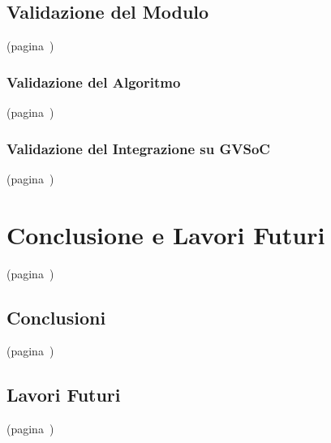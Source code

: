 \section{Validazione del Modulo}(pagina~\pageref{sec:mod_val})
\subsection{Validazione del Algoritmo}(pagina~\pageref{sec:alg_val})
\subsection{Validazione del Integrazione su GVSoC}(pagina~\pageref{sec:gvsoc_val})

\chapter{Conclusione e Lavori Futuri} (pagina~\pageref{chap:conclusion})
\section{Conclusioni}(pagina~\pageref{sec:res_sum})
\section{Lavori Futuri}(pagina~\pageref{sec:future_work})